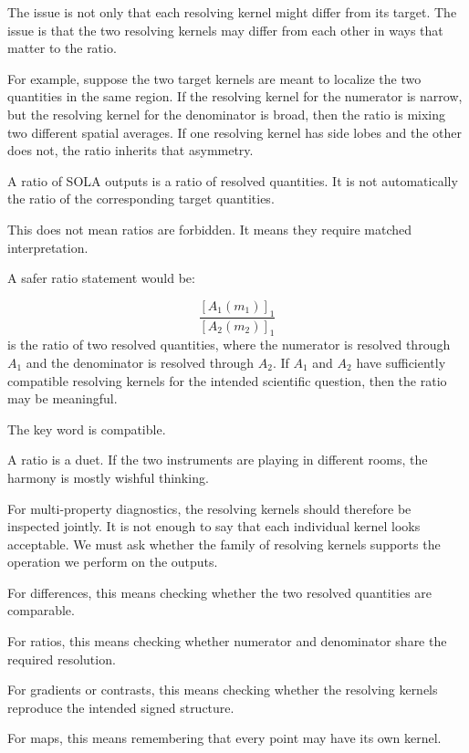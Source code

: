 \documentclass[11pt,openany]{book}
\theoremstyle{definition}
\theoremstyle{remark}
\begin{document}
The issue is not only that each resolving kernel might differ from its target. The issue is that
the two resolving kernels may differ from each other in ways that matter to the ratio.

For example, suppose the two target kernels are meant to localize the two quantities in the same
region. If the resolving kernel for the numerator is narrow, but the resolving kernel for the
denominator is broad, then the ratio is mixing two different spatial averages. If one resolving
kernel has side lobes and the other does not, the ratio inherits that asymmetry.

\begin{warningbox}
A ratio of SOLA outputs is a ratio of resolved quantities. It is not automatically the ratio of the
corresponding target quantities.
\end{warningbox}

This does not mean ratios are forbidden. It means they require matched interpretation.

A safer ratio statement would be:

\[
  \frac{[A_1(m_1)]_1}{[A_2(m_2)]_1}
\]
is the ratio of two resolved quantities, where the numerator is resolved through \(A_1\) and the
denominator is resolved through \(A_2\). If \(A_1\) and \(A_2\) have sufficiently compatible
resolving kernels for the intended scientific question, then the ratio may be meaningful.

The key word is compatible.

\begin{intuitionbox}
A ratio is a duet. If the two instruments are playing in different rooms, the harmony is mostly
wishful thinking.
\end{intuitionbox}

For multi-property diagnostics, the resolving kernels should therefore be inspected jointly. It is
not enough to say that each individual kernel looks acceptable. We must ask whether the family
of resolving kernels supports the operation we perform on the outputs.

For differences, this means checking whether the two resolved quantities are comparable.

For ratios, this means checking whether numerator and denominator share the required
resolution.

For gradients or contrasts, this means checking whether the resolving kernels reproduce the
intended signed structure.

For maps, this means remembering that every point may have its own kernel.
\end{document}

